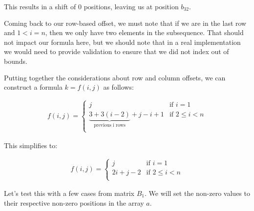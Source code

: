 \documentclass[12pt,letterpaper,final]{report}
\begin{document}
\begin{enumerate}
        This results in a shift of 0 positions, leaving us at position $b_{32}$.

        Coming back to our row-based offset, we must note that if we are in the last row and $1 < i = n$, then we only have two elements in the subsequence. That should not impact our formula here, but we should note that in a real implementation we would need to provide validation to ensure that we did not index out of bounds.

        Putting together the considerations about row and column offsets, we can construct a formula $k = f(i, j)$ as follows:

        \begin{align*}
          f(i, j) =
          \begin{cases}
            j                                                            & \text{if } i = 1       \\
            \underbrace{3 + 3(i-2)}_{\text{previous i rows}} + j - i + 1 & \text{if } 2 \le i < n \\
          \end{cases}
        \end{align*}

        This simplifies to:

        \begin{align*}
          f(i, j) =
          \begin{cases}
            j          & \text{if } i = 1       \\
            2i + j - 2 & \text{if } 2 \le i < n \\
          \end{cases}
        \end{align*}

        Let's test this with a few cases from matrix $B_1$. We will set the non-zero values to their respective non-zero positions in the array $a$.


\end{enumerate}
\end{document}
